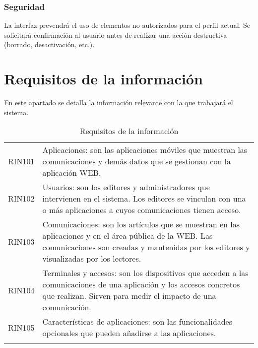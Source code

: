 \subsubsection*{Seguridad}
La interfaz prevendrá el uso de elementos no autorizados para el perfil actual. Se solicitará confirmación al usuario antes de realizar una acción  destructiva (borrado, desactivación, etc.).


\section{Requisitos de la información}
En este apartado se detalla la información relevante con la que trabajará el sistema.
\label{cuadro:requisitos-de-la-informacion}
\begin{longtable}{lp{13.7cm}}
  RIN101\label{RIN101} & Aplicaciones: son las aplicaciones móviles que muestran las comunicaciones y demás datos que se gestionan con la aplicación WEB. \\
  RIN102\label{RIN102} & Usuarios: son los editores y administradores que intervienen en el sistema. Los editores se vinculan con una o más aplicaciones a cuyos comunicaciones tienen acceso. \\
  RIN103\label{RIN103} & Comunicaciones: son los artículos que se muestran en las aplicaciones y en el área pública de la WEB. Las comunicaciones son creadas y mantenidas por los editores y visualizadas por los lectores. \\
  RIN104\label{RIN104} & Terminales y accesos: son los dispositivos que acceden a las comunicaciones de una aplicación y los accesos concretos que realizan. Sirven para medir el impacto de una comunicación.\\
  RIN105\label{RIN105} & Características de aplicaciones: son las funcionalidades opcionales que pueden añadirse a las aplicaciones. \\
  \caption{Requisitos de la información} \\
\end{longtable}
